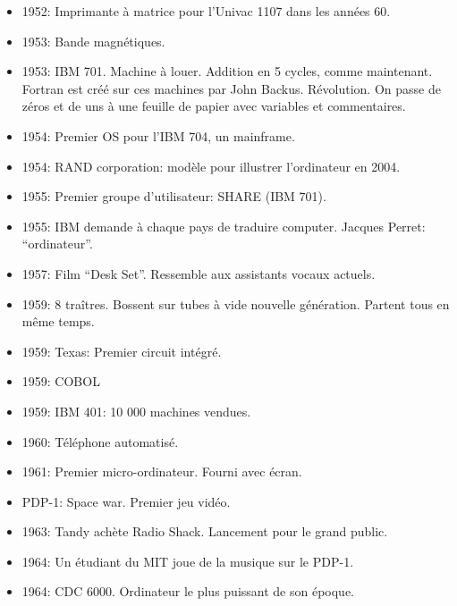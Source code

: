 \documentclass[a4paper,11pt]{article}
\begin{document}
\begin{itemize}
\item 1952: Imprimante à matrice pour l'Univac 1107 dans les années 60.

\item 1953:  Bande magnétiques.

\item 1953: IBM 701. Machine à louer. Addition en 5 cycles, comme maintenant.
  Fortran est créé sur ces machines par John Backus. Révolution. On passe de
  zéros et de uns à une feuille de papier avec variables et commentaires.

\item 1954: Premier OS pour l'IBM 704, un mainframe.

\item 1954: RAND corporation: modèle pour illustrer l'ordinateur en 2004.

\item 1955: Premier groupe d'utilisateur: SHARE (IBM 701).

\item 1955: IBM demande à chaque pays de traduire computer. Jacques Perret: ``ordinateur''.

\item 1957: Film ``Desk Set''. Ressemble aux assistants vocaux actuels.

\item 1959: 8 traîtres. Bossent sur tubes à vide nouvelle génération. Partent
  tous en même temps.

\item 1959: Texas: Premier circuit intégré.

\item 1959: COBOL

\item 1959: IBM 401: 10 000 machines vendues.

\item 1960: Téléphone automatisé.

\item 1961: Premier micro-ordinateur. Fourni avec écran.

\item PDP-1: Space war. Premier jeu vidéo.

\item 1963: Tandy achète Radio Shack. Lancement pour le grand public.

\item 1964: Un étudiant du MIT joue de la musique sur le PDP-1.

\item 1964: CDC 6000. Ordinateur le plus puissant de son époque.


\end{itemize}
\end{document}
